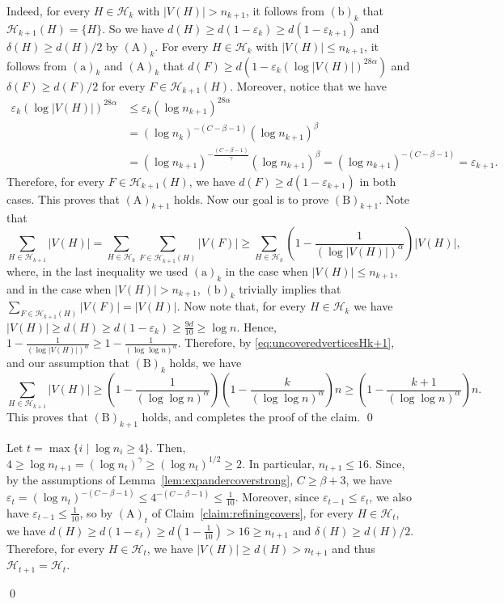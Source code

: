\documentclass[10pt]{article}
\theoremstyle{plain}
\numberwithin{theorem}{section}
\theoremstyle{definition}
\theoremstyle{remark}
\renewenvironment{proof}[1][]{\begin{trivlist}
\item[\hspace{\labelsep}{\bf\noindent Proof#1.\/}] }{\qed\end{trivlist}}
\newcommand{\cH}{\mathcal{H}}
\newcommand{\eps}{\varepsilon}
\theoremstyle{plain}
\begin{document}
\begin{proof}[ of Lemma~\ref{lem:expandercoverstrong}]
\begin{proof}[ of claim]
		Indeed, for every $H \in \cH_k$ with $|V(H)| > n_{k+1}$, it follows from $\mathrm{(b)}_k$ that $\cH_{k+1}(H) = \{H\}$. So we have $d(H) \ge d(1 - \eps_k) \ge d(1 - \eps_{k+1})$ and $\delta(H) \ge d(H)/2$ by $\mathrm{(A)}_k$. For every $H \in \cH_k$ with $|V(H)| \le n_{k+1}$, it follows from $\mathrm{(a)}_k$ and $\mathrm{(A)}_k$ that $d(F) \ge d(1-\eps_{k} (\log |V(H)|)^{28 \alpha})$ and $\delta(F) \ge d(F)/2$ for every $F \in \cH_{k+1}(H)$. Moreover, notice that we have 
		\begin{align*}
			\eps_{k} (\log |V(H)|)^{28 \alpha} 
			& \le \eps_{k} (\log n_{k+1})^{28 \alpha} \\
			& = (\log n_k)^{-(C-\beta-1)} (\log n_{k+1})^{\beta} \\
			& = (\log n_{k+1})^{-\frac{(C-\beta-1)}{\gamma}} (\log n_{k+1})^{\beta} 
			= (\log n_{k+1})^{-(C-\beta -1)} 
			= \eps_{k+1}.
		\end{align*}
		Therefore, for every $F \in \cH_{k+1}(H)$, we have $d(F) \ge d(1 - \eps_{k+1})$ in both cases. This proves that $\mathrm{(A)}_{k+1}$ holds. 
		Now our goal is to prove $\mathrm{(B)}_{k+1}$.  Note that 
		\begin{equation}
			\label{eq:uncoveredverticesHk+1}
			\sum_{H \in \cH_{k+1}} |V(H)| = \sum_{H \in \cH_{k}} \sum_{F \in \cH_{k+1}(H)} |V(F)| \ge  \sum_{H \in \cH_k} \left(1 - \frac{1}{(\log |V(H)|)^{\alpha}} \right) |V(H)|, 
		\end{equation}
		where, in the last inequality we used $\mathrm{(a)}_k$ in the case when $|V(H)| \le n_{k+1}$, and in the case when $|V(H)| > n_{k+1}$, $\mathrm{(b)}_k$ trivially implies that  $\sum_{F \in \cH_{k+1}(H)} |V(F)| = |V(H)|$.  Now note that, for every $H \in \cH_k$ we have $|V(H)| \ge d(H) \ge d(1 - \eps_k) \ge \frac{9 d }{10} \ge \log n$. Hence, $1 - \frac{1}{(\log |V(H)|)^{\alpha}} \ge 1 - \frac{1}{(\log \log n)^{\alpha}}$. Therefore, by \eqref{eq:uncoveredverticesHk+1}, and our assumption that $\mathrm{(B)}_k$ holds, we have 
		$$ \sum_{H \in \cH_{k+1}} |V(H)| \ge \left(1 - \frac{1}{(\log \log n)^{\alpha}}\right) \left(1 - \frac{k}{(\log \log n)^{\alpha}} \right) n \ge \left(1 - \frac{k+1}{(\log \log n)^{\alpha}}\right) n.$$
		This proves that $\mathrm{(B)}_{k+1}$ holds, and completes the proof of the claim.
	\end{proof}
	Let $t = \max \{ i \mid \log n_i \ge 4 \}$. Then, $4 \ge \log n_{t+1} = (\log n_t)^{\gamma} \ge (\log n_t)^{1/2} \ge 2.$ In particular, $n_{t+1} \le 16$. Since, by the assumptions of Lemma~\ref{lem:expandercoverstrong}, $C \ge \beta + 3$, we have $\eps_t = (\log n_t)^{-(C-\beta-1)} \le 4^{-(C-\beta-1)} \le \frac{1}{10}$. Moreover, since $\eps_{t-1} \le \eps_t$, we also have $\eps_{t-1} \le \frac{1}{10}$, so by $\mathrm{(A)}_t$ of Claim~\ref{claim:refiningcovers}, for every $H \in \cH_{t}$, we have $d(H) \ge d(1 - \eps_{t}) \ge d(1 - \frac{1}{10}) > 16 \ge n_{t+1}$ and $\delta(H) \ge d(H)/2$. Therefore, for every $H \in \cH_t$, we have $|V(H)| \ge d(H) > n_{t+1}$ and thus $\cH_{t+1} = \cH_t$. 
	

\end{proof}
\end{document}
